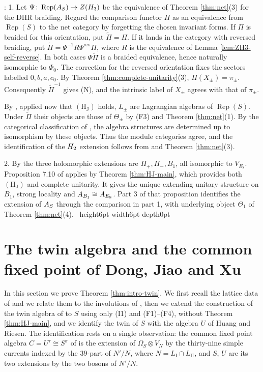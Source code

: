 \documentclass[leqno]{article}
\let\cal\relax
\newcommand{\cal}{\mathcal}
\newcommand{\qed}{\hfill \vrule height6pt  width6pt depth0pt}
\newcommand{\co}{\colon}
\newcommand{\ot}{\otimes}
\DeclareMathOperator{\Rep}{Rep}
\newenvironment{proof}[1][]{\noindent {\it Proof #1} : }{\hbox{~}\qed
\smallskip
}
\numberwithin{equation}{section}
\begin{document}
\begin{proof}
1. Let $\Psi\co\Rep(\cal A_S)\to Z(\cal H_3)$ be the equivalence of Theorem \ref{thm:net}(3) for the DHR braiding. Regard the comparison functor $\Pi$ as an equivalence from $\Rep(S)$ to the net category by forgetting the chosen invariant forms. If $\Pi$ is braided for this orientation, put $\widetilde\Pi=\Pi$. If it lands in the category with reversed braiding, put $\widetilde\Pi=\Psi^{-1}R\Psi^{\mathrm{rev}}\Pi$, where $R$ is the equivalence of Lemma \ref{lem:ZH3-self-reverse}. In both cases $\Psi\widetilde\Pi$ is a braided equivalence, hence naturally isomorphic to $\Phi_0$. The correction for the reversed orientation fixes the sectors labelled $0,b,a,c_0$. By Theorem \ref{thm:complete-unitarity}(3), $\Pi(X_\pm)=\pi_\pm$. Consequently $\widetilde\Pi^{-1}$ gives (N), and the intrinsic label of $X_\pm$ agrees with that of $\pi_\pm$.

By \cite[Theorem 3.9]{ArhII}, applied now that $\mathrm{(H_J)}$ holds, $L_\pm$ are Lagrangian algebras of $\Rep(S)$. Under $\widetilde\Pi$ their objects are those of $\Theta_\pm$ by (F3) and Theorem \ref{thm:net}(1). By the categorical classification of \cite[Proposition 3.3]{ArhII}, the algebra structures are determined up to isomorphism by these objects. Thus the module categories agree, and the identification of the $\cal H_2$ extension follows from \cite[Proposition 3.6]{ArhII} and Theorem \ref{thm:net}(3).

2. By \cite[Theorem 3.9]{ArhII} the three holomorphic extensions are $H_+,H_-,B_1$, all isomorphic to $V_{E_8}$. Proposition 7.10 of \cite{ArhII} applies by Theorem \ref{thm:HJ-main}, which provides both $\mathrm{(H_J)}$ and complete unitarity. It gives the unique extending unitary structure on $B_1$, strong locality and $\cal A_{B_1}\cong\cal A_{E_8}$. Part 3 of that proposition identifies the extension of $\cal A_S$ through the comparison in part 1, with underlying object $\Theta_1$ of Theorem \ref{thm:net}(4).
\end{proof}

\section{The twin algebra and the common fixed point of Dong, Jiao and Xu}
\label{sec:genus}

In this section we prove Theorem \ref{thm:intro-twin}. We first recall the lattice data of \cite[Section 12]{Arh26} and we relate them to the involutions of \cite[Section 5]{DJX26}, then we extend the construction of the twin algebra of \cite[Theorem 12.3]{Arh26} to $S$ using only (I1) and (F1)--(F4), without Theorem \ref{thm:HJ-main}, and we identify the twin of $S$ with the algebra $U$ of Huang and Riesen. The identification rests on a single observation: the common fixed point algebra $C = U^\tau \cong S^\sigma$ of \cite[Theorem 7.3]{DJX26} is the extension of $\Omega_S \ot V_N$ by the thirty-nine simple currents indexed by the $39$-part of $N'/N$, where $N = L_{\mathrm I} \cap L_{\mathrm{II}}$, and $S$, $U$ are its two extensions by the two bosons of $N'/N$.
\end{document}
